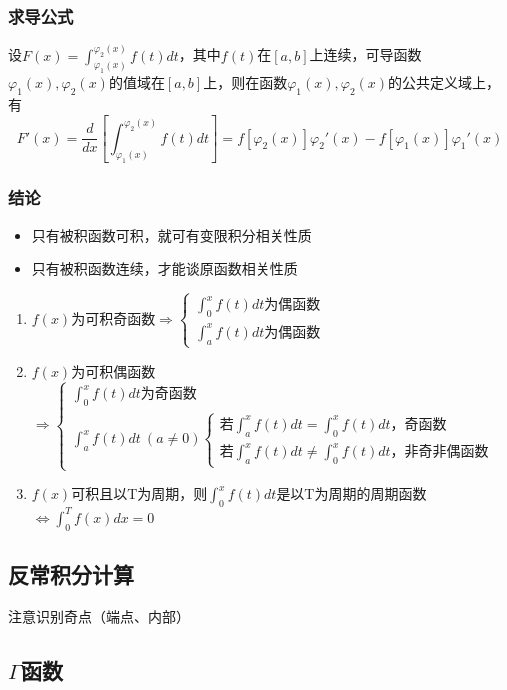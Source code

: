 \subsubsection{求导公式}
设\(F(x) = \displaystyle\int_{\varphi_1(x)}^{\varphi_2(x)}f(t)dt\)，其中\(f(t)\)在\([a, b]\)上连续，可导函数\(\varphi_1(x), \varphi_2(x)\)的值域在\([a, b]\)上，则在函数\(\varphi_1(x), \varphi_2(x)\)的公共定义域上，有\[F'(x) = \dfrac{d}{dx}[\int_{\varphi_1(x)}^{\varphi_2(x)}f(t)dt] = f[\varphi_2(x)]\varphi_2'(x) - f[\varphi_1(x)]\varphi_1'(x)\]

\subsubsection{结论}
\begin{itemize}
    \item 只有被积函数可积，就可有变限积分相关性质
    \item 只有被积函数连续，才能谈原函数相关性质
\end{itemize}
\begin{enumerate}
    \item \(f(x)\)为可积奇函数\(\Rightarrow \begin{cases}
        \int_0^xf(t)dt\text{为偶函数} \\ 
        \int_a^xf(t)dt\text{为偶函数}
    \end{cases}\)
    \item \(f(x)\)为可积偶函数\(\Rightarrow \begin{cases}
        \int_0^xf(t)dt\text{为奇函数} \\ 
        \int_a^xf(t)dt\ (a \neq 0) \begin{cases}
            \text{若}\int_a^xf(t)dt = \int_0^xf(t)dt\text{，奇函数} \\ 
            \text{若}\int_a^xf(t)dt \neq \int_0^xf(t)dt\text{，非奇非偶函数}
        \end{cases}
    \end{cases}\)
    \item \(f(x)\)可积且以T为周期，则\(\int_0^xf(t)dt\)是以T为周期的周期函数\(\Leftrightarrow \int_0^Tf(x)dx = 0\)
\end{enumerate}


\subsection{反常积分计算}
注意识别奇点（端点、内部）


\subsection{\(\Gamma\)函数}
